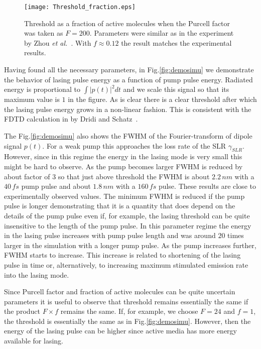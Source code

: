 \documentclass{iopart}
\begin{document}
\begin{figure} %
\texttt{[image: Threshold\_fraction.eps]}
\caption[Fig4]{Threshold as a fraction of active molecules when the 
Purcell factor was taken as $F=200$. Parameters
were similar as in the experiment by Zhou {\it et al.}~\cite{zhou_lasing_2013}. With $f\approx 0.12$ the result matches the experimental results.}
\label{fig:threshold}
\end{figure} 

Having found all the necessary parameters, 
in Fig.\ref{fig:demosimu} we demonstrate the behavior
of lasing pulse energy as a function of pump pulse energy.
Radiated energy is proportional to $\int |p(t)|^2dt$ and we scale
this signal so that its maximum value is $1$ in the figure. As is clear there is a clear threshold after which the lasing pulse energy grows in a non-linear fashion.
This is consistent with the FDTD calculation in by Dridi and Schatz~\cite{dridi_model_2013}.
 
The Fig.\ref{fig:demosimu} also shows the FWHM of the
Fourier-transform of dipole signal $p(t)$. For a weak pump this approaches the loss rate of the SLR $\gamma_{SLR}$. However, since in this regime the energy in the lasing mode is very small
this might be hard to observe. 
As the pump becomes larger FWHM is reduced by about factor of $3$
so that just above threshold the FWHM is about $2.2\, nm$ with a $40\, fs$ pump pulse
and about $1.8\, nm$ with a $160\, fs$ pulse. These results are close to experimentally observed 
values. The minimum FWHM is reduced if the pump pulse is longer demonstrating that it is a 
quantity that does depend on the details of the pump pulse even if, for example, 
the  lasing threshold can be quite insensitive to the length of the pump pulse. In this parameter regime the
energy in the lasing pulse increases  with pump pulse length and was 
around $20$ times larger in the simulation with a longer pump pulse.
As the pump increases further, FWHM starts to increase. This increase is related to
shortening of the lasing pulse in time or, alternatively, to increasing maximum stimulated emission
rate into the lasing mode. 

Since Purcell factor and fraction of active molecules can be quite uncertain parameters it is useful to observe
that threshold remains essentially the same if the product $F\times f$ remains the same.
If, for example, we choose $F=24$ and $f=1$, the threshold is essentially
the same as in
Fig.\ref{fig:demosimu}. However, then the energy of the lasing pulse can be higher since
active media has more energy available for lasing.
\end{document}
